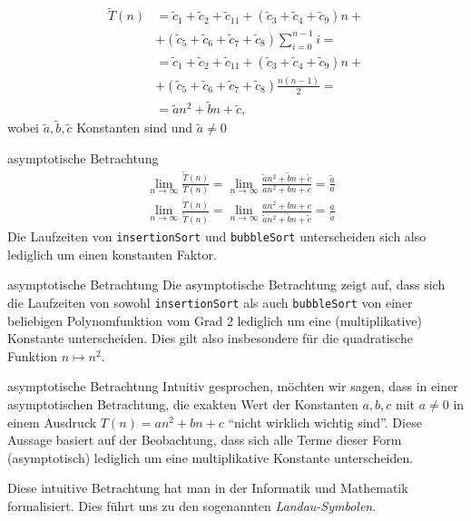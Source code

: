 \begin{frame}[fragile]
	\begin{align*}
		\tilde{T}(n) & = \tilde{c}_1 +  \tilde{c}_2 + \tilde{c}_{11} + (\tilde{c}_3 + \tilde{c}_4 + \tilde{c}_9)n + \\
		             & + (\tilde{c}_5 + \tilde{c}_6 + \tilde{c}_7 + \tilde{c}_8) \sum_{i=0}^{n-1}i =                \\
		             & = \tilde{c}_1 +  \tilde{c}_2 + \tilde{c}_{11} + (\tilde{c}_3 + \tilde{c}_4 + \tilde{c}_9)n + \\
		             & + (\tilde{c}_5 + \tilde{c}_6 + \tilde{c}_7 + \tilde{c}_8) \frac{n(n-1)}{2} =                 \\
		             & = \tilde{a}n^2 + \tilde{b}n + \tilde{c},
	\end{align*}
	wobei $\tilde{a}, \tilde{b}, \tilde{c}$ Konstanten sind und $\tilde{a}\neq 0$
\end{frame}

\begin{frame}{asymptotische Betrachtung}
	\begin{align*}
		 & \lim_{n\to\infty}\frac{\tilde{T}(n)}{T(n)} = \lim_{n\to\infty}\frac{\tilde{a}n^2 + \tilde{b}n + \tilde{c}}{an^2 + bn + c} =\frac{\tilde{a}}{a}
	\end{align*}
	\begin{align*}
		 & \lim_{n\to\infty}\frac{T(n)}{\tilde{T}(n)} = \lim_{n\to\infty}\frac{an^2 + bn + c}{\tilde{a}n^2 + \tilde{b}n + \tilde{c}} =\frac{a}{\tilde{a}}
	\end{align*}
	Die Laufzeiten von \texttt{insertionSort} und \texttt{bubbleSort} unterscheiden sich also lediglich um einen konstanten Faktor.
\end{frame}

\begin{frame}{asymptotische Betrachtung}
	Die asymptotische Betrachtung zeigt auf, dass sich die Laufzeiten von sowohl \texttt{insertionSort} als auch \texttt{bubbleSort} von einer beliebigen Polynomfunktion vom Grad 2 lediglich um eine (multiplikative) Konstante unterscheiden. Dies gilt also insbesondere für die quadratische Funktion $n\mapsto n^2$.
\end{frame}

\begin{frame}{asymptotische Betrachtung}
	Intuitiv gesprochen, möchten wir sagen, dass in einer asymptotischen Betrachtung, die exakten Wert der Konstanten $a, b, c$ mit $a\neq 0$ in einem Ausdruck $T(n) = an^2 + bn + c$ \enquote{nicht wirklich wichtig sind}. Diese Aussage basiert auf der Beobachtung, dass sich alle Terme dieser Form (asymptotisch) lediglich um eine multiplikative Konstante unterscheiden.

	Diese intuitive Betrachtung hat man in der Informatik und Mathematik formalisiert. Dies führt uns zu den sogenannten \textit{Landau-Symbolen}.
\end{frame}

